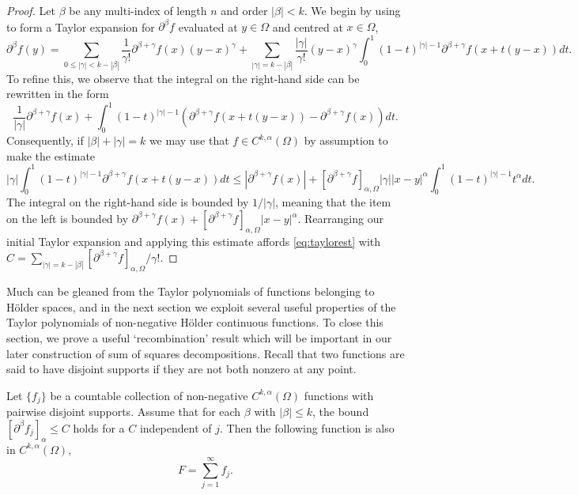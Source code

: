 \documentclass[oneside,hidelinks,indentfirst,10pt]{book}
\begin{document}
\begin{proof}
Let \(\beta\) be any multi-index of length \(n\) and order \(|\beta|<k\). We begin by using  to form a Taylor expansion for \(\partial^\beta f\) evaluated at \(y\in\Omega\) and centred at \(x\in\Omega\),
\[
    \partial^\beta f(y)=\sum_{0\leq |\gamma|<k-|\beta|}\frac{1}{\gamma!}\partial^{\beta+\gamma} f(x)(y-x)^\gamma+\sum_{|\gamma|=k-|\beta|}\frac{|\gamma|}{\gamma!}(y-x)^\gamma\int_0^1(1-t)^{|\gamma|-1}\partial^{\beta+\gamma}f(x+t(y-x))dt.
\]
To refine this, we observe that the integral on the right-hand side can be rewritten in the form
\[
    \frac{1}{|\gamma|}\partial^{\beta+\gamma}f(x)+\int_0^1(1-t)^{|\gamma|-1}(\partial^{\beta+\gamma}f(x+t(y-x))-\partial^{\beta+\gamma}f(x))dt.
\]
Consequently, if \(|\beta|+|\gamma|=k\) we may use that \(f\in C^{k,\alpha}(\Omega)\) by assumption to make the estimate 
\[
    |\gamma|\int_0^1(1-t)^{|\gamma|-1}\partial^{\beta+\gamma}f(x+t(y-x))dt\leq |\partial^{\beta+\gamma}f(x)|+[\partial^{\beta+\gamma}f]_{\alpha,\Omega}|\gamma||x-y|^\alpha\int_0^1(1-t)^{|\gamma|-1}t^\alpha dt.
\]
The integral on the right-hand side is bounded by \(1/|\gamma|\), meaning that the item on the left is bounded by \(\partial^{\beta+\gamma}f(x)+[\partial^{\beta+\gamma}f]_{\alpha,\Omega}|x-y|^\alpha\). Rearranging our initial Taylor expansion and applying this estimate affords \eqref{eq:taylorest} with \(C=\sum_{|\gamma|=k-|\beta|}[\partial^{\beta+\gamma}f]_{\alpha,\Omega}/\gamma!\).
\end{proof}


Much can be gleaned from the Taylor polynomials of functions belonging to H\"older spaces, and in the next section we exploit several useful properties of the Taylor polynomials of non-negative H\"older continuous functions. To close this section, we prove a useful `recombination' result which will be important in our later construction of sum of squares decompositions. Recall that two functions are said to have disjoint supports if they are not both nonzero at any point.


\begin{lem}\label{lem:recomb}
Let \(\{f_j\}\) be a countable collection of non-negative \(C^{k,\alpha}(\Omega)\) functions with pairwise disjoint supports. Assume that for each \(\beta\) with \(|\beta|\leq k \), the bound \([\partial^\beta f_j]_\alpha\leq C\) holds for a \(C\) independent of \(j\). Then the following function is also in \(C^{k,\alpha}(\Omega)\),
\[
    F=\sum_{j=1}^\infty f_j.
\]
\end{lem}
\end{document}
